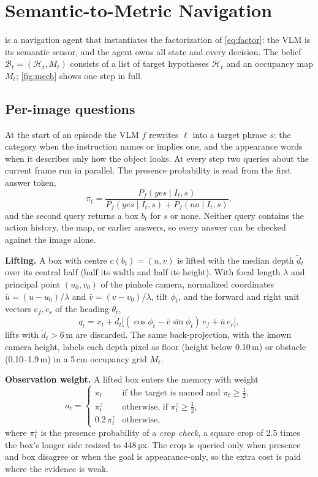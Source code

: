 \section{Semantic-to-Metric Navigation}
\label{sec:method}

\ours is a navigation agent that instantiates the factorization of \cref{eq:factor}: the VLM is its semantic
sensor, and the agent owns all state and every decision. The belief
$\mathcal{B}_t=(\mathcal{H}_t,M_t)$ consists of a list of target hypotheses $\mathcal{H}_t$ and an occupancy map
$M_t$; \cref{fig:mech} shows one step in full.

\subsection{Per-image questions}
At the start of an episode the VLM $f$ rewrites $\ell$ into a target phrase $s$: the category when the instruction
names or implies one, and the appearance words when it describes only how the object looks. At every step two
queries about the current frame run in parallel. The presence probability is read from the first answer token,
\begin{equation}
\pi_t=\frac{P_f(\textit{yes}\mid I_t,s)}{P_f(\textit{yes}\mid I_t,s)+P_f(\textit{no}\mid I_t,s)},
\label{eq:presence}
\end{equation}
and the second query returns a box $b_t$ for $s$ or none. Neither query contains the action history, the map,
or earlier answers, so every answer can be checked against the image alone.

\noindent\textbf{Lifting.}
A box with centre $c(b_t)=(u,v)$ is lifted with the median depth $\tilde d_t$ over its central half (half its width
and half its height). With focal length $\lambda$ and principal point $(u_0,v_0)$ of the pinhole camera, normalized
coordinates $\bar u=(u-u_0)/\lambda$ and $\bar v=(v-v_0)/\lambda$, tilt $\phi_t$, and the forward and right unit
vectors $e_f,e_r$ of the heading $\theta_t$,
\begin{equation}
q_t=x_t+\tilde d_t\big[(\cos\phi_t-\bar v\sin\phi_t)\,e_f+\bar u\,e_r\big],
\label{eq:lift}
\end{equation}
lifts with $\tilde d_t>6$\,m are discarded. The same
back-projection, with the known camera height, labels each depth pixel as floor (height below 0.10\,m) or obstacle
(0.10--1.9\,m) in a 5\,cm occupancy grid $M_t$.

\noindent\textbf{Observation weight.}
A lifted box enters the memory with weight
\begin{equation}
a_t=\begin{cases}\pi_t & \text{if the target is named and } \pi_t\ge\tfrac12,\\
\pi^z_t & \text{otherwise, if } \pi^z_t\ge\tfrac12,\\
0.2\,\pi^z_t & \text{otherwise,}\end{cases}
\label{eq:weight}
\end{equation}
where $\pi^z_t$ is the presence probability of a \emph{crop check}, a square crop of 2.5 times the box's longer
side resized to 448\,px. The crop is queried only when presence and box disagree or when the goal is
appearance-only, so the extra cost is paid where the evidence is weak.

